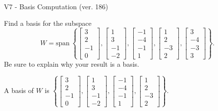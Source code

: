 \begin{exercise}
  \begin{exerciseTitle}V7 - Basis Computation (ver. 186)\end{exerciseTitle}
  \begin{exerciseStatement}
    Find a basis for the subspace 
\[W=\mathrm{span}\ \left\{\left[\begin{array}{r}
3 \\
2 \\
-1 \\
0
\end{array}\right] , \left[\begin{array}{r}
1 \\
3 \\
-1 \\
-2
\end{array}\right] , \left[\begin{array}{r}
-1 \\
-4 \\
-1 \\
1
\end{array}\right] , \left[\begin{array}{r}
1 \\
2 \\
-3 \\
2
\end{array}\right] , \left[\begin{array}{r}
3 \\
-4 \\
-3 \\
3
\end{array}\right]\right\}.\]
 Be sure to explain why your result is a basis.


  \end{exerciseStatement}
  \begin{exerciseAnswer}
   A basis of \(W\) is  \(\left\{\left[\begin{array}{r}
3 \\
2 \\
-1 \\
0
\end{array}\right] , \left[\begin{array}{r}
1 \\
3 \\
-1 \\
-2
\end{array}\right] , \left[\begin{array}{r}
-1 \\
-4 \\
-1 \\
1
\end{array}\right] , \left[\begin{array}{r}
1 \\
2 \\
-3 \\
2
\end{array}\right]\right\}\).
  


  \end{exerciseAnswer}
\end{exercise}